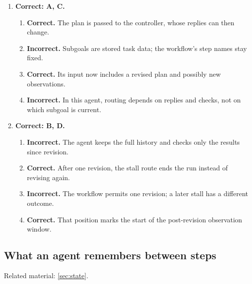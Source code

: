 \begin{enumerate}[start=1,itemsep=0.7\baselineskip]
\item[{\hyperref[exercise:9]{9.}}] \begin{minipage}[t]{\linewidth}
\textbf{Correct: A, C.}
\begin{enumerate}[label=\textnormal{(\Alph*)},leftmargin=*,itemsep=0pt]
\item \textbf{Correct.} The plan is passed to the controller, whose replies can then change.
\item \textbf{Incorrect.} Subgoals are stored task data; the workflow's step names stay fixed.
\item \textbf{Correct.} Its input now includes a revised plan and possibly new observations.
\item \textbf{Incorrect.} In this agent, routing depends on replies and checks, not on which subgoal is current.
\end{enumerate}
\end{minipage}

\item[{\hyperref[exercise:10]{10.}}] \begin{minipage}[t]{\linewidth}
\textbf{Correct: B, D.}
\begin{enumerate}[label=\textnormal{(\Alph*)},leftmargin=*,itemsep=0pt]
\item \textbf{Incorrect.} The agent keeps the full history and checks only the results since revision.
\item \textbf{Correct.} After one revision, the stall route ends the run instead of revising again.
\item \textbf{Incorrect.} The workflow permits one revision; a later stall has a different outcome.
\item \textbf{Correct.} That position marks the start of the post-revision observation window.
\end{enumerate}
\end{minipage}

\end{enumerate}

\subsection{What an agent remembers between steps}
\noindent Related material: \cref{sec:state}.

